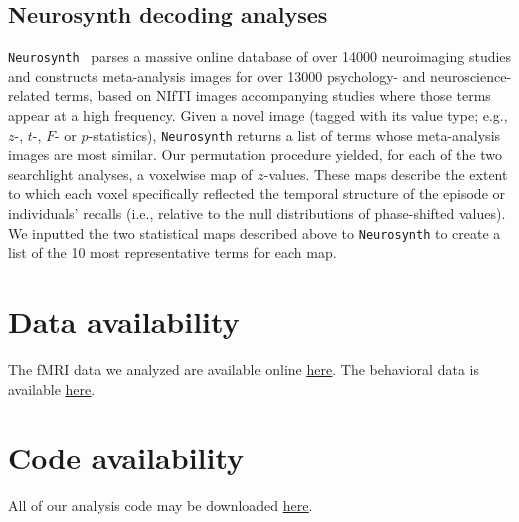 \documentclass[10pt]{article}
\begin{document}
\subsection*{Neurosynth decoding analyses}
\texttt{Neurosynth}~\citep{YarkEtal11} parses a massive online database of over 14000 neuroimaging studies and constructs meta-analysis images for over 13000 psychology- and neuroscience-related terms, based on NIfTI images accompanying studies where those terms appear at a high frequency.  Given a novel image (tagged with its value type; e.g., $z$-, $t$-, $F$- or $p$-statistics), \texttt{Neurosynth} returns a list of terms whose meta-analysis images are most similar.  Our permutation procedure yielded, for each of the two searchlight analyses, a voxelwise map of $z$-values.  These maps describe the extent to which each voxel specifically reflected the temporal structure of the episode or individuals' recalls (i.e., relative to the null distributions of phase-shifted values). We inputted the two statistical maps described above to \texttt{Neurosynth} to create a list of the 10 most representative terms for each map.

\section*{Data availability}
The fMRI data we analyzed are available online \href{http://dataspace.princeton.edu/jspui/handle/88435/dsp01nz8062179}{\underline{here}}.  The behavioral data is available  \href{https://github.com/ContextLab/sherlock-topic-model-paper}{\underline{here}}.

\section*{Code availability}
All of our analysis code may be downloaded \href{https://github.com/ContextLab/sherlock-topic-model-paper}{\underline{here}}.


%
\end{document}
